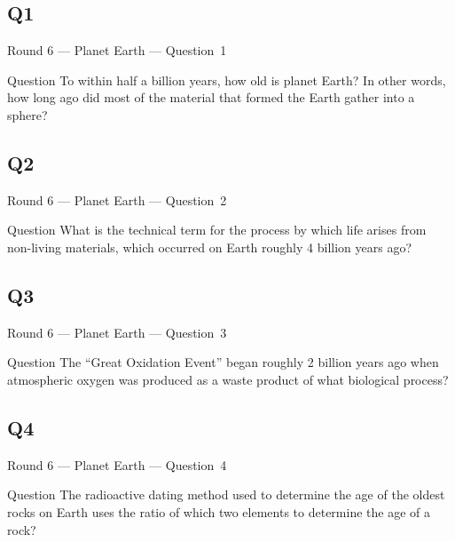 \documentclass[11pt]{beamer}
\begin{document}
\subsection*{Q1}
\begin{frame}[t]{Round 6 --- Planet Earth --- \mbox{Question 1}}
\vspace{-0.5em}
\begin{block}{Question}
To within half a billion years, how old is planet Earth? In other words, how long ago did most of the material that formed the Earth gather into a sphere?
\end{block}
\end{frame}
\subsection*{Q2}
\begin{frame}[t]{Round 6 --- Planet Earth --- \mbox{Question 2}}
\vspace{-0.5em}
\begin{block}{Question}
What is the technical term for the process by which life arises from non-living materials, which occurred on Earth roughly 4 billion years ago?
\end{block}
\end{frame}
\subsection*{Q3}
\begin{frame}[t]{Round 6 --- Planet Earth --- \mbox{Question 3}}
\vspace{-0.5em}
\begin{block}{Question}
The ``Great Oxidation Event'' began roughly 2 billion years ago when atmospheric oxygen was produced as a waste product of what biological process?
\end{block}
\end{frame}
\subsection*{Q4}
\begin{frame}[t]{Round 6 --- Planet Earth --- \mbox{Question 4}}
\vspace{-0.5em}
\begin{block}{Question}
The radioactive dating method used to determine the age of the oldest rocks on Earth uses the ratio of which two elements to determine the age of a rock?
\end{block}
\end{frame}
\end{document}
